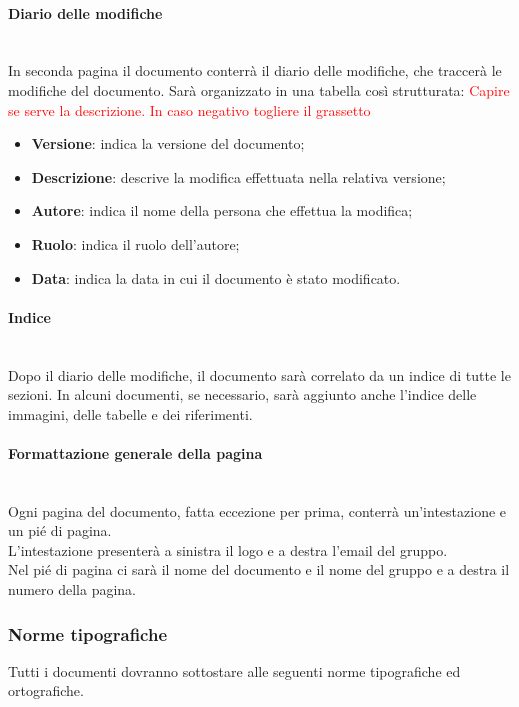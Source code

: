 	\paragraph{Diario delle modifiche}
	~\\In seconda pagina il documento conterrà il diario delle modifiche, che traccerà le modifiche del documento. Sarà organizzato in una tabella così strutturata:
	\textcolor{red}{Capire se serve la descrizione. In caso negativo togliere il grassetto}
	\begin{itemize}
		\item \textbf{Versione}:
		indica la versione del documento;
		\item \textbf{Descrizione}:
		descrive la modifica effettuata nella relativa versione;
		\item \textbf{Autore}:
		indica il nome della persona che effettua la modifica;
		\item \textbf{Ruolo}:
		indica il ruolo dell'autore;
		\item \textbf{Data}:
		indica la data in cui il documento è stato modificato.
	\end{itemize}
	\paragraph{Indice}
	~\\Dopo il diario delle modifiche, il documento sarà correlato da un indice di tutte le sezioni. In alcuni documenti, se necessario, sarà aggiunto anche l'indice delle immagini, delle tabelle e dei riferimenti.
	\paragraph{Formattazione generale della pagina}
	~\\Ogni pagina del documento, fatta eccezione per prima, conterrà un'intestazione e un pié di pagina.
	\\L'intestazione presenterà a sinistra il logo e a destra l'email del gruppo.
	\\Nel pié di pagina ci sarà il nome del documento e il nome del gruppo e a destra il numero della pagina.
	\subsubsection{Norme tipografiche}
	Tutti i documenti dovranno sottostare alle seguenti norme tipografiche ed ortografiche.
